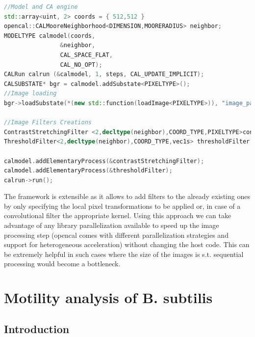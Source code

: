 \documentclass[conference]{IEEEtran}
\begin{document}
\begin{framed}
\begin{lstlisting}[language=C++,caption=Example of usage of the Image processing XCA engine. A model and a CA runtime are created. The raw image is then read into the substate. Elementary processes corrensponding to the operations to be performed on the image are set and the runtime is launched. ,label=list:imgman]	
//Model and CA engine
std::array<uint, 2> coords = { 512,512 }
opencal::CALMooreNeighborhood<DIMENSION,MOORERADIUS> neighbor;
MODELTYPE calmodel(coords,
                &neighbor,
                CAL_SPACE_FLAT,
                CAL_NO_OPT);
CALRun calrun (&calmodel, 1, steps, CAL_UPDATE_IMPLICIT); 
CALSUBSTATE* bgr = calmodel.addSubstate<PIXELTYPE>();
//Image loading
bgr->loadSubstate(*(new std::function(loadImage<PIXELTYPE>)), "image_path");

//Image Filters Creations
ContrastStretchingFilter <2,decltype(neighbor),COORD_TYPE,PIXELTYPE>contrastStretchingFilter(bgr, 1285, 1542, 0, 65535,1.0);
ThresholdFilter<2,decltype(neighbor),COORD_TYPE,vec1s> thresholdFilter (bgr,0,61680,0,65535);

calmodel.addElementaryProcess(&contrastStretchingFilter);
calmodel.addElementaryProcess(&thresholdFilter);
calrun->run();
\end{lstlisting}
\end{framed}
The framework is extensible as it allows to add filters to the already existing ones by only specifying the local pixel transformations to be applied or, in case of a convolutional filter the appropriate kernel.
Using this approach we can take advantage of any library parallelization available to speed up the image processing step (opencal comes with different parallelization strategies and support for heterogeneous acceleration) without changing the host code. This can be extremely helpful in such cases where the size of the images is s.t. sequential processing would become a bottleneck.



\section{Motility analysis of B. subtilis}
\label{sect:bacteriaanalysis}
\subsection{Introduction}
\end{document}
